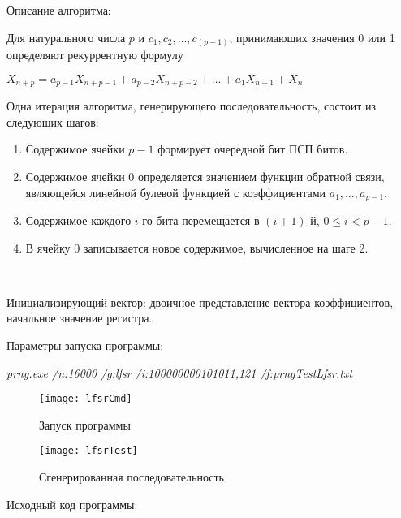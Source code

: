 \documentclass[bachelor, och, coursework]{shiza}
\begin{document}
	Описание алгоритма:
	
	Для натурального числа $p$ и $c_1,c_2,…,c_(p-1)$, принимающих значения 0 или 1 определяют рекуррентную формулу
	\begin{center}
		$X_{n+p}  = a_{p-1} X_{n+p-1}  + a_{p-2} X_{n+p-2}  + … + a_1 X_{n+1}  + X_n$
	\end{center}
	
	Одна итерация алгоритма, генерирующего последовательность, состоит 
	из следующих шагов:
	\begin{enumerate}
		\item Содержимое ячейки $p - 1$ формирует очередной бит ПСП битов.
		\item Содержимое ячейки 0 определяется значением функции обратной связи, 
		являющейся линейной булевой функцией с коэффициентами $a_1, \dots, a_{p - 1}$.
		\item Содержимое каждого $i$-го бита перемещается в $(i + 1)$-й, $0 \leq i < p - 1$. 
		\item В ячейку 0 записывается новое содержимое, вычисленное на шаге 2.
	\end{enumerate} \

	Инициализирующий вектор: двоичное представление вектора коэффициентов, начальное значение регистра.
	
	Параметры запуска программы:
	
	\textit{prng.exe /n:16000 /g:lfsr /i:100000000101011,121 /f:prngTestLfsr.txt}

	\begin{figure}[H]
		\centering
		\texttt{[image: lfsrCmd]}
		\caption{Запуск программы}
		\label{fig:lfsrCmd}
	\end{figure}
	
	\begin{figure}[H]
		\centering
		\texttt{[image: lfsrTest]}
		\caption{Сгенерированная последовательность}
		\label{fig:lfsrTest}
	\end{figure}

		Исходный код программы:
	
\end{document}
